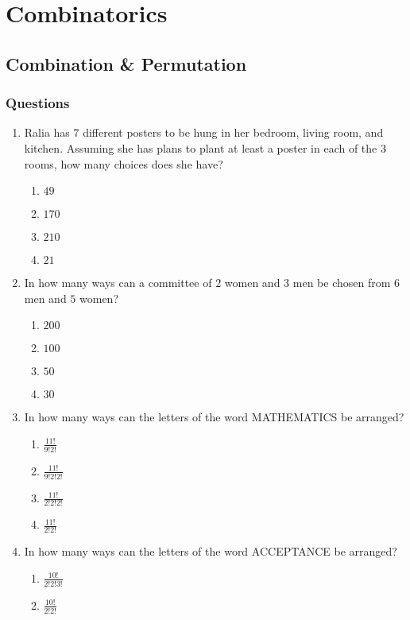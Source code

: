 \chapter{Combinatorics}
\section{Combination \& Permutation}
\subsection{Questions}
\begin{multicols}{2}
\begin{enumerate}[label={\arabic*.}]
\item Ralia has \(7\) different posters to be hung in her bedroom, living room, and kitchen. Assuming she has plans to plant at least a poster in each of the \(3\) rooms, how many choices does she have?
	\begin{enumerate}[label={\Alph*.}]
	\item \(49\)
	\item \(170\)
	\item \(210\)
	\item \(21\)
	\end{enumerate}
\item In how many ways can a committee of \(2\) women and \(3\) men be chosen from \(6\) men and \(5\) women?
	\begin{enumerate}[label={\Alph*.}]
	\item \(200\)
	\item \(100\)
	\item \(50\)
	\item \(30\)
	\end{enumerate}
\item In how many ways can the letters of the word MATHEMATICS be arranged?
	\begin{enumerate}[label={\Alph*.}]
	\item \(\tfrac{11!}{9!2!}\)
	\item \(\tfrac{11!}{9!2!2!}\)
	\item \(\tfrac{11!}{2!2!2!}\)
	\item \(\tfrac{11!}{2!2!}\)
	\end{enumerate}
\item In how many ways can the letters of the word ACCEPTANCE be arranged?
	\begin{enumerate}[label={\Alph*.}]
	\item \(\tfrac{10!}{2!2!3!}\)
	\item \(\tfrac{10!}{2!2!}\)

\end{enumerate}
\end{enumerate}
\end{multicols}
